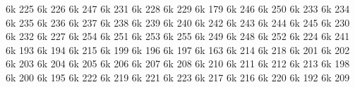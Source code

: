 \characterdef \CYRA               6k  225
\characterdef \CYRB               6k  226
\characterdef \CYRV               6k  247
\characterdef \CYRG               6k  231
\characterdef \CYRD               6k  228
\characterdef \CYRE               6k  229
\characterdef \CYRYO              6k  179
\characterdef \CYRZH              6k  246
\characterdef \CYRZ               6k  250
\characterdef \CYRI               6k  233
\characterdef \CYRISHRT           6k  234
\characterdef \CYRK               6k  235
\characterdef \CYRL               6k  236
\characterdef \CYRM               6k  237
\characterdef \CYRN               6k  238
\characterdef \CYRO               6k  239
\characterdef \CYRP               6k  240
\characterdef \CYRR               6k  242
\characterdef \CYRS               6k  243
\characterdef \CYRT               6k  244
\characterdef \CYRU               6k  245
\characterdef \CYRF               6k  230
\characterdef \CYRH               6k  232
\characterdef \CYRC               6k  227
\characterdef \CYRCH              6k  254
\characterdef \CYRSH              6k  251
\characterdef \CYRSHCH            6k  253
\characterdef \CYRHRDSN           6k  255
\characterdef \CYRERY             6k  249
\characterdef \CYRSFTSN           6k  248
\characterdef \CYREREV            6k  252
\characterdef \CYRYU              6k  224
\characterdef \CYRYA              6k  241
\characterdef \cyra               6k  193
\characterdef \cyrb               6k  194
\characterdef \cyrv               6k  215
\characterdef \cyrg               6k  199
\characterdef \cyrd               6k  196
\characterdef \cyre               6k  197
\characterdef \cyryo              6k  163
\characterdef \cyrzh              6k  214
\characterdef \cyrz               6k  218
\characterdef \cyri               6k  201
\characterdef \cyrishrt           6k  202
\characterdef \cyrk               6k  203
\characterdef \cyrl               6k  204
\characterdef \cyrm               6k  205
\characterdef \cyrn               6k  206
\characterdef \cyro               6k  207
\characterdef \cyrp               6k  208
\characterdef \cyrr               6k  210
\characterdef \cyrs               6k  211
\characterdef \cyrt               6k  212
\characterdef \cyru               6k  213
\characterdef \cyrf               6k  198
\characterdef \cyrh               6k  200
\characterdef \cyrc               6k  195
\characterdef \cyrch              6k  222
\characterdef \cyrsh              6k  219
\characterdef \cyrshch            6k  221
\characterdef \cyrhrdsn           6k  223
\characterdef \cyrery             6k  217
\characterdef \cyrsftsn           6k  216
\characterdef \cyrerev            6k  220
\characterdef \cyryu              6k  192
\characterdef \cyrya              6k  209

